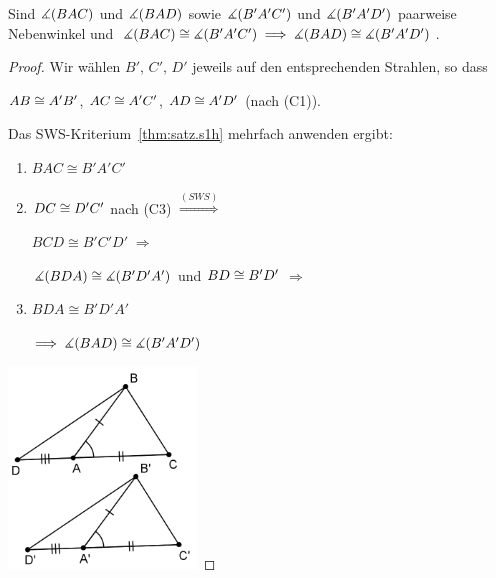 \begin{thm}\label{thm:satz.s1k}
    Sind $\mbox{$\measuredangle$}(BAC)$ und $\mbox{$\measuredangle$}(BAD)$ sowie $\mbox{$\measuredangle$}(B'A'C')$ und $\mbox{$\measuredangle$}(B'A'D')$ paarweise Nebenwinkel und
    $\mbox{$\measuredangle$}(BAC) \cong \mbox{$\measuredangle$}(B'A'C')\; \Longrightarrow\; \mbox{$\measuredangle$}(BAD) \cong \mbox{$\measuredangle$}(B'A'D')$.
\end{thm}

\begin{proof}
    Wir wählen $B',\, C',\, D'$ jeweils auf den entsprechenden Strahlen, so dass

    ${AB} \cong {A'B'}$, ${AC} \cong {A'C'}$, ${AD} \cong {A'D'}$ (nach
    (C1)).

    Das SWS-Kriterium~\ref{thm:satz.s1h} mehrfach anwenden ergibt:

    \renewcommand{\labelenumi}{\arabic{enumi}.} %
    \begin{enumerate}
        \item $BAC\cong B'A'C'$

        \item ${DC}\cong{D'C'}$ nach (C3) $\stackrel{(SWS)}{\Longrightarrow}$

            $BCD \cong B'C'D'\; \Longrightarrow$

            $\mbox{$\measuredangle$}(BDA) \cong \mbox{$\measuredangle$}(B'D'A')$ und ${BD} \cong {B'D'}$ $\Rightarrow$

        \item $BDA \cong B'D'A'$

            $\Longrightarrow\; \mbox{$\measuredangle$}(BAD) \cong \mbox{$\measuredangle$}(B'A'D')$

    \end{enumerate}

    \centerline{\includegraphics[width=5cm]{BILDER/1-2-13-Nebenwinkel.png}}
\end{proof}


